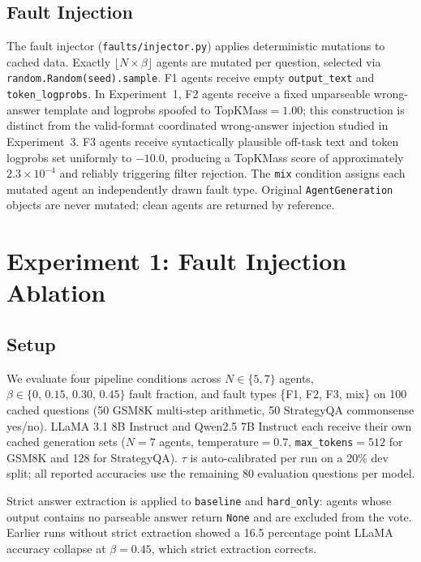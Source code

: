 \documentclass[11pt]{article}
\begin{document}
\subsection{Fault Injection}
\label{sec:faults}

The fault injector (\texttt{faults/injector.py}) applies deterministic mutations
to cached data. Exactly $\lfloor N \times \beta \rfloor$ agents are mutated per
question, selected via \texttt{random.Random(seed).sample}. F1 agents receive
empty \texttt{output\_text} and \texttt{token\_logprobs}. In Experiment~1, F2
agents receive a fixed unparseable wrong-answer template and logprobs spoofed to
TopKMass$=1.00$; this construction is distinct from the valid-format
coordinated wrong-answer injection studied in Experiment~3. F3 agents receive
syntactically plausible off-task text and token logprobs set
uniformly to $-10.0$, producing a TopKMass score of approximately
$2.3\times10^{-4}$ and reliably triggering filter rejection. The \texttt{mix}
condition assigns each mutated agent an independently drawn fault type. Original
\texttt{AgentGeneration} objects are never mutated; clean agents are returned by
reference.

\section{Experiment 1: Fault Injection Ablation}
\label{sec:exp1}

\subsection{Setup}
\label{sec:exp1-setup}

We evaluate four pipeline conditions across $N \in \{5,7\}$ agents,
$\beta \in \{0,\,0.15,\,0.30,\,0.45\}$ fault fraction, and fault types
\{F1, F2, F3, mix\} on 100 cached questions (50 GSM8K multi-step arithmetic,
50 StrategyQA commonsense yes/no). LLaMA 3.1 8B Instruct \citep{metaai2024llama} and Qwen2.5 7B
Instruct \citep{qwenteam2024qwen25} each receive their own cached generation sets ($N=7$ agents,
temperature$=0.7$, \texttt{max\_tokens}$=512$ for GSM8K and 128 for
StrategyQA). $\tau$ is auto-calibrated per run on a 20\% dev split; all reported
accuracies use the remaining 80 evaluation questions per model.

Strict answer extraction is applied to \texttt{baseline} and \texttt{hard\_only}:
agents whose output contains no parseable answer return \texttt{None} and are
excluded from the vote. Earlier runs without strict extraction showed a 16.5
percentage point LLaMA accuracy collapse at $\beta=0.45$, which strict extraction
corrects.
\end{document}
